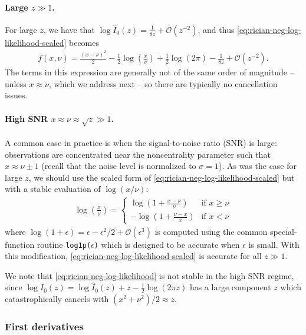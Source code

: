 \documentclass{article}
\begin{document}
\paragraph{Large $z \gg 1$.}

For large $z$, we have that $\log \hat{I}_0(z) = \frac{1}{8 z} + \mathcal{O}(z^{-2})$, and thus \cref{eq:rician-neg-log-likelihood-scaled} becomes
%
\begin{align}
  f(x, \nu) = \frac{(x-\nu)^2}{2} - \frac{1}{2}\log\left(\frac{x}{\nu}\right) + \frac{1}{2}\log(2\pi) - \frac{1}{8 z} + \mathcal{O}(z^{-2}).
\end{align}
%
The terms in this expression are generally not of the same order of magnitude -- unless $x \approx \nu$, which we address next -- so there are typically no cancellation issues.

\paragraph{High SNR $x \approx \nu \approx \sqrt{z} \gg 1$.}

A common case in practice is when the signal-to-noise ratio (SNR) is large:
observations are concentrated near the noncentrality parameter such that $x \approx \nu \pm 1$ (recall that the noise level is normalized to $\sigma=1$).
As was the case for large $z$, we should use the scaled form of \cref{eq:rician-neg-log-likelihood-scaled} but with a stable evaluation of $\log(x/\nu)$:
%
\begin{align}
  \log\left(\frac{x}{\nu}\right) = \begin{cases}
    \log\left(1 + \frac{x-\nu}{\nu}\right) & \text{if } x \ge \nu \\
    -\log\left(1 + \frac{\nu-x}{x}\right)  & \text{if } x < \nu
  \end{cases}
\end{align}
%
where $\log(1 + \epsilon) = \epsilon - \epsilon^2/2 + \mathcal{O}(\epsilon^3)$ is computed using the common special-function routine \texttt{log1p($\epsilon$)} which is designed to be accurate when $\epsilon$ is small.
With this modification, \cref{eq:rician-neg-log-likelihood-scaled} is accurate for all $z \gg 1$.

We note that \cref{eq:rician-neg-log-likelihood} is not stable in the high SNR regime, since $\log I_0(z) = \log \hat{I}_0(z) + z - \frac{1}{2}\log(2\pi z)$ has a large component $z$ which catastrophically cancels with $(x^2 + \nu^2) / 2 \approx z$.

\subsubsection{First derivatives}
\end{document}
